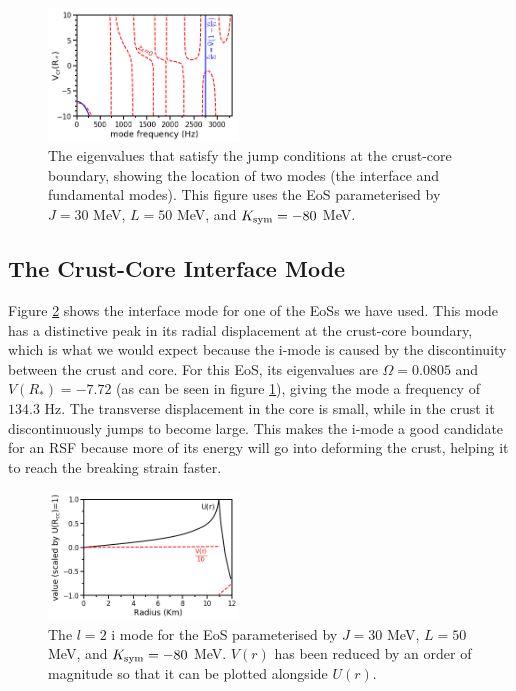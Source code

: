 \documentclass[fleqn,usenatbib]{mnras}
\begin{document}
\begin{figure}
\centering
\includegraphics[width=0.45\textwidth,angle=0]{minima_30_50_-80.png}
\caption{The eigenvalues that satisfy the jump conditions at the crust-core boundary, showing the location of two modes (the interface and fundamental modes). This figure uses the EoS parameterised by $J=30$ MeV, $L=50$ MeV, and $K_{\rm sym}=-80$ MeV.}
\label{fig:trace_minima}
\end{figure}








\subsection{The Crust-Core Interface Mode}
\hspace{\parindent}Figure \ref{fig:2i_mode} shows the interface mode for one of the EoSs we have used. This mode has a distinctive peak in its radial displacement at the crust-core boundary, which is what we would expect because the i-mode is caused by the discontinuity between the crust and core. For this EoS, its eigenvalues are $\Omega=0.0805$ and $V(R_*)=-7.72$ (as can be seen in figure \ref{fig:trace_minima}), giving the mode a frequency of $134.3$ Hz. The transverse displacement in the core is small, while in the crust it discontinuously jumps to become large. This makes the i-mode a good candidate for an RSF because more of its energy will go into deforming the crust, helping it to reach the breaking strain faster.

\begin{figure}
\centering
\includegraphics[width=0.45\textwidth,angle=0]{2i2_30_50_-80.png}
\caption{The $l=2$ i mode for the EoS parameterised by $J=30$ MeV, $L=50$ MeV, and $K_{\rm sym}=-80$ MeV. $V(r)$ has been reduced by an order of magnitude so that it can be plotted alongside $U(r)$.}
\label{fig:2i_mode}
\end{figure}
\end{document}
